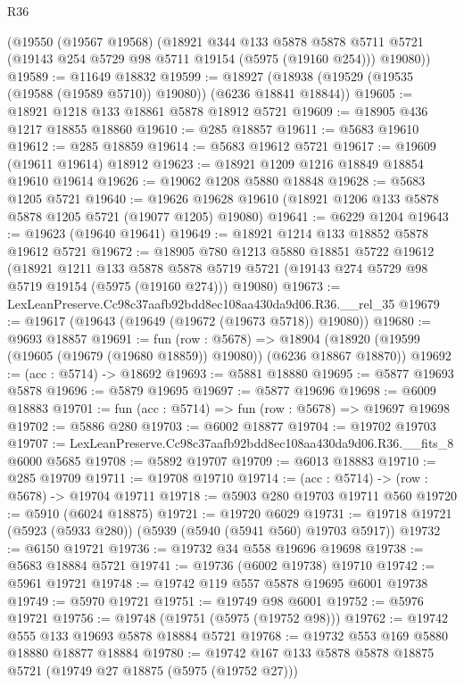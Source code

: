 \begin{lexlean}{R36}
\begin{coremodule}
    (@19550
      (@19567 @19568)
      (@18921
        @344
        @133
        @5878
        @5878
        @5711
        @5721
        (@19143 @254 @5729 @98 @5711 @19154 (@5975 (@19160 @254)))
        @19080))
@19589 := @11649 @18832
@19599 := @18927 (@18938 (@19529 (@19535 (@19588 (@19589 @5710)) @19080)) (@6236 @18841 @18844))
@19605 := @18921 @1218 @133 @18861 @5878 @18912 @5721
@19609 := @18905 @436 @1217 @18855 @18860
@19610 := @285 @18857
@19611 := @5683 @19610
@19612 := @285 @18859
@19614 := @5683 @19612 @5721
@19617 := @19609 (@19611 @19614) @18912
@19623 := @18921 @1209 @1216 @18849 @18854 @19610 @19614
@19626 := @19062 @1208 @5880 @18848
@19628 := @5683 @1205 @5721
@19640 := @19626 @19628 @19610 (@18921 @1206 @133 @5878 @5878 @1205 @5721 (@19077 @1205) @19080)
@19641 := @6229 @1204
@19643 := @19623 (@19640 @19641)
@19649 := @18921 @1214 @133 @18852 @5878 @19612 @5721
@19672 := @18905
    @780
    @1213
    @5880
    @18851
    @5722
    @19612
    (@18921
      @1211
      @133
      @5878
      @5878
      @5719
      @5721
      (@19143 @274 @5729 @98 @5719 @19154 (@5975 (@19160 @274)))
      @19080)
@19673 := LexLeanPreserve.Cc98c37aafb92bdd8ec108aa430da9d06.R36.__rel_35
@19679 := @19617 (@19643 (@19649 (@19672 (@19673 @5718)) @19080))
@19680 := @9693 @18857
@19691 := fun (row : @5678) =>
  @18904 (@18920 (@19599 (@19605 (@19679 (@19680 @18859)) @19080)) (@6236 @18867 @18870))
@19692 := (acc : @5714) -> @18692
@19693 := @5881 @18880
@19695 := @5877 @19693 @5878
@19696 := @5879 @19695
@19697 := @5877 @19696
@19698 := @6009 @18883
@19701 := fun (acc : @5714) => fun (row : @5678) => @19697 @19698
@19702 := @5886 @280
@19703 := @6002 @18877
@19704 := @19702 @19703
@19707 := LexLeanPreserve.Cc98c37aafb92bdd8ec108aa430da9d06.R36.__fits_8 @6000 @5685
@19708 := @5892 @19707
@19709 := @6013 @18883
@19710 := @285 @19709
@19711 := @19708 @19710
@19714 := (acc : @5714) -> (row : @5678) -> @19704 @19711
@19718 := @5903 @280 @19703 @19711 @560
@19720 := @5910 (@6024 @18875)
@19721 := @19720 @6029
@19731 := @19718 @19721 (@5923 (@5933 @280)) (@5939 (@5940 (@5941 @560) @19703 @5917))
@19732 := @6150 @19721
@19736 := @19732 @34 @558 @19696 @19698
@19738 := @5683 @18884 @5721
@19741 := @19736 (@6002 @19738) @19710
@19742 := @5961 @19721
@19748 := @19742 @119 @557 @5878 @19695 @6001 @19738
@19749 := @5970 @19721
@19751 := @19749 @98 @6001
@19752 := @5976 @19721
@19756 := @19748 (@19751 (@5975 (@19752 @98)))
@19762 := @19742 @555 @133 @19693 @5878 @18884 @5721
@19768 := @19732 @553 @169 @5880 @18880 @18877 @18884
@19780 := @19742 @167 @133 @5878 @5878 @18875 @5721 (@19749 @27 @18875 (@5975 (@19752 @27)))

\end{coremodule}
\end{lexlean}
